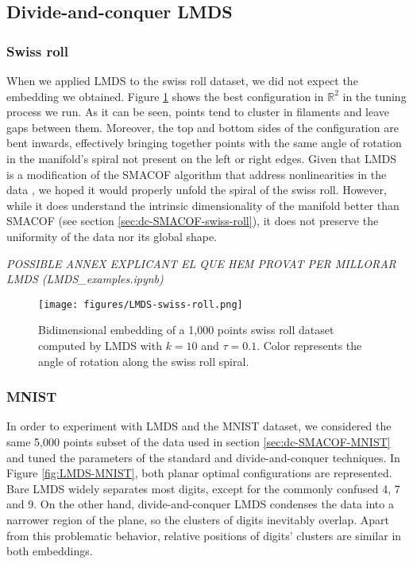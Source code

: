 \subsection{Divide-and-conquer LMDS}

\subsubsection{Swiss roll}

When we applied LMDS to the swiss roll dataset, we did not expect the embedding we obtained. Figure \ref{fig:LMDS-swiss-roll} shows the best configuration in $\mathbb{R}^2$ in the tuning process we run. As it can be seen, points tend to cluster in filaments and leave gaps between them. Moreover, the top and bottom sides of the configuration are bent inwards, effectively bringing together points with the same angle of rotation in the manifold's spiral not present on the left or right edges. Given that LMDS is a modification of the SMACOF algorithm that address nonlinearities in the data \citep{Chen2009}, we hoped it would properly unfold the spiral of the swiss roll. However, while it does understand the intrinsic dimensionality of the manifold better than SMACOF (see section \ref{sec:dc-SMACOF-swiss-roll}), it does not preserve the uniformity of the data nor its global shape.

\textit{POSSIBLE ANNEX EXPLICANT EL QUE HEM PROVAT PER MILLORAR LMDS (LMDS\_examples.ipynb)}

\begin{figure}
    \centering
    \texttt{[image: figures/LMDS-swiss-roll.png]}
    \caption{Bidimensional embedding of a 1,000 points swiss roll dataset \citep{Spiwokv2007} computed by LMDS with $k=10$ and $\tau = 0.1$. Color represents the angle of rotation along the swiss roll spiral.}
    \label{fig:LMDS-swiss-roll}
\end{figure}

\subsubsection{MNIST}

In order to experiment with LMDS and the MNIST dataset, we considered the same 5,000 points subset of the data used in section \ref{sec:dc-SMACOF-MNIST} and tuned the parameters of the standard and divide-and-conquer techniques. In Figure \ref{fig:LMDS-MNIST}, both planar optimal configurations are represented. Bare LMDS widely separates most digits, except for the commonly confused 4, 7 and 9. On the other hand, divide-and-conquer LMDS condenses the data into a narrower region of the plane, so the clusters of digits inevitably overlap. Apart from this problematic behavior, relative positions of digits' clusters are similar in both embeddings.

